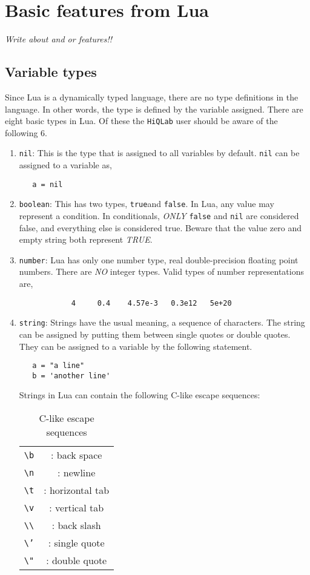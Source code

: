 \newpage
\section{Basic features from Lua}
\emph{Write about and or features!!}

\subsection{Variable types}
Since Lua is a dynamically typed language, there
are no type definitions in the language. In other
words, the type is defined by the variable assigned. 
There are eight basic types in Lua. Of these the
{\tt HiQLab} user should be aware of the following 6.
\begin{enumerate}
\item {\tt nil}: This is the type that is assigned to all variables
by default. {\tt nil} can be assigned to a variable as,
\begin{verbatim}
   a = nil
\end{verbatim}
\item {\tt boolean}: This has two types, {\tt true}and {\tt false}. 
In Lua, any value may represent a condition. In conditionals,
\emph{ONLY} {\tt false} and {\tt nil} are considered false, and everything
else is considered true. Beware that the value zero and empty string
both represent \emph{TRUE}. 
\item {\tt number}: Lua has only one number type, real double-precision
floating point numbers. There are \emph{NO} integer types. Valid types
of number representations are,
\begin{verbatim}
            4     0.4    4.57e-3   0.3e12   5e+20
\end{verbatim}
\item {\tt string}: Strings have the usual meaning, a sequence of 
characters. The string can be assigned by putting them between 
single quotes or double quotes. They can be assigned to a variable 
by the following statement.
\begin{verbatim}
   a = "a line"
   b = 'another line'
\end{verbatim}
Strings in Lua can contain the following C-like escape sequences:
\begin{table}[htbp]
\caption{C-like escape sequences}
\centering
\begin{tabular}{c|c}
{\tt \textbackslash b} & : back space \\
{\tt \textbackslash n} & : newline \\
{\tt \textbackslash t} & : horizontal tab \\
{\tt \textbackslash v} & : vertical tab \\
{\tt \textbackslash\textbackslash} & : back slash \\
{\tt \textbackslash '} & : single quote \\
{\tt \textbackslash "} & : double quote 
\end{tabular}
\end{table}


\end{enumerate}
